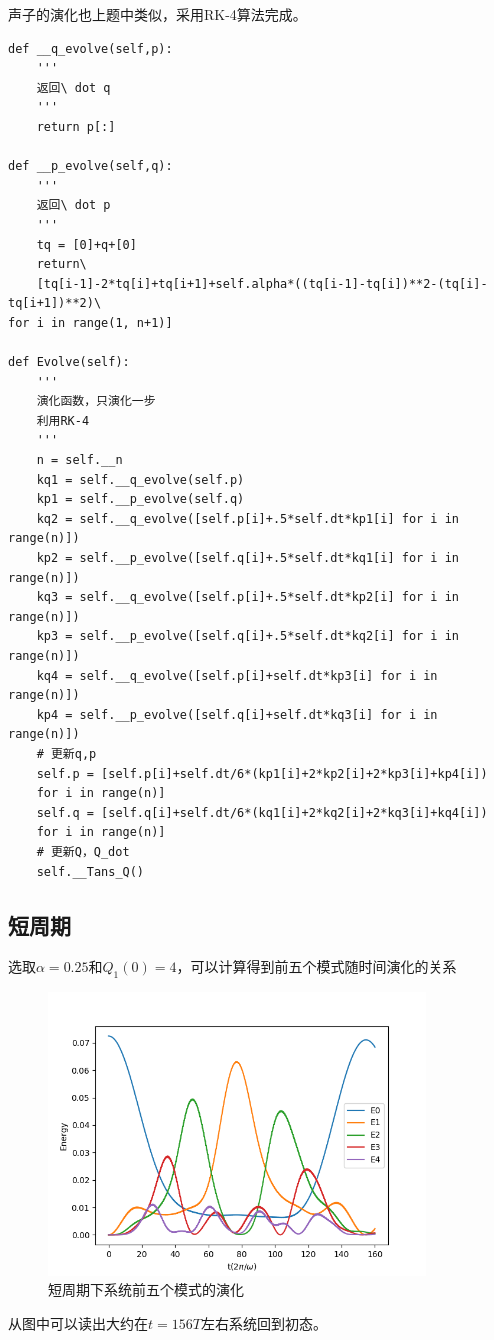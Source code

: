 \documentclass[a4paper]{ctexart}
\begin{document}
声子的演化也上题中类似，采用RK-4算法完成。
\begin{lstlisting}
def __q_evolve(self,p):
	'''
	返回\ dot q
	'''
	return p[:]

def __p_evolve(self,q):
	'''
	返回\ dot p
	'''
	tq = [0]+q+[0]
	return\
	[tq[i-1]-2*tq[i]+tq[i+1]+self.alpha*((tq[i-1]-tq[i])**2-(tq[i]-tq[i+1])**2)\
for i in range(1, n+1)]

def Evolve(self):
	'''
	演化函数，只演化一步
	利用RK-4
	'''
	n = self.__n
	kq1 = self.__q_evolve(self.p)
	kp1 = self.__p_evolve(self.q)
	kq2 = self.__q_evolve([self.p[i]+.5*self.dt*kp1[i] for i in range(n)])
	kp2 = self.__p_evolve([self.q[i]+.5*self.dt*kq1[i] for i in range(n)])
	kq3 = self.__q_evolve([self.p[i]+.5*self.dt*kp2[i] for i in range(n)])
	kp3 = self.__p_evolve([self.q[i]+.5*self.dt*kq2[i] for i in range(n)])
	kq4 = self.__q_evolve([self.p[i]+self.dt*kp3[i] for i in range(n)])
	kp4 = self.__p_evolve([self.q[i]+self.dt*kq3[i] for i in range(n)])
	# 更新q,p
	self.p = [self.p[i]+self.dt/6*(kp1[i]+2*kp2[i]+2*kp3[i]+kp4[i])
	for i in range(n)]
	self.q = [self.q[i]+self.dt/6*(kq1[i]+2*kq2[i]+2*kq3[i]+kq4[i])
	for i in range(n)]
	# 更新Q，Q_dot
	self.__Tans_Q()
\end{lstlisting}
\subsection{短周期}
选取$\alpha  =0.25$和$Q_1(0)=4$，可以计算得到前五个模式随时间演化的关系
\begin{figure}[hbt]
	\centering
	\includegraphics[width=10cm]{./fig/Prob3_2.png}
	\caption{短周期下系统前五个模式的演化}
\end{figure}
从图中可以读出大约在$t=156T$左右系统回到初态。
\end{document}
